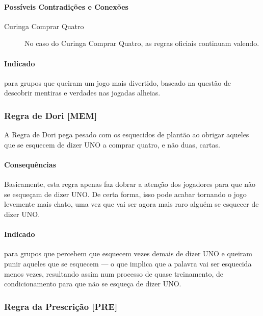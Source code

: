 \paragraph{Possíveis Contradições e Conexões}

\begin{description}
\item[Curinga Comprar Quatro]{No caso do Curinga Comprar Quatro, as regras oficiais continuam valendo.}
\end{description}

\paragraph{Indicado} 

para grupos que queiram um jogo mais divertido, baseado na questão de descobrir mentiras e verdades nas jogadas alheias.

\subsubsection{Regra de Dori [MEM]}

A Regra de Dori pega pesado com os esquecidos de plantão ao obrigar aqueles que se esquecem de dizer UNO a comprar quatro, e não duas, cartas.

\paragraph{Consequências}

Basicamente, esta regra apenas faz dobrar a atenção dos jogadores para que não se esqueçam de dizer UNO. De certa forma, isso pode acabar tornando o jogo levemente mais chato, uma vez que vai ser agora mais raro alguém se esquecer de dizer UNO. 

\paragraph{Indicado} 

para grupos que percebem que esquecem vezes demais de dizer UNO e queiram punir aqueles que se esquecem --- o que implica que a palavra vai ser esquecida menos vezes, resultando assim num processo de quase treinamento, de condicionamento para que não se esqueça de dizer UNO.

\subsubsection{Regra da Prescrição [PRE]}

